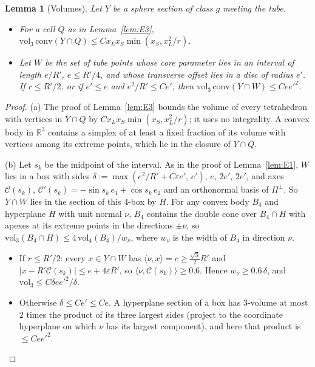 \documentclass[aps,prx,twocolumn,superscriptaddress,nofootinbib,longbibliography]{revtex4-2}
\theoremstyle{plain}
\newtheorem{lemma}{Lemma}
\theoremstyle{definition}
\theoremstyle{remark}
\newcommand{\R}{\mathbb{R}}
\begin{document}
\begin{lemma}[Volumes]\label{lem:F3}
Let $Y$ be a sphere section of class $g$ meeting the tube.
\begin{itemize}\setlength\itemsep{0pt}
\item[(a)] For a cell $Q$ as in Lemma~\ref{lem:E3}, $\mathrm{vol}_3\,\mathrm{conv}(Y\cap Q)\le Cx_Lx_S\min(x_S,x_L^2/r)$.
\item[(b)] Let $W$ be the set of tube points whose core parameter lies in an interval of length $e/R'$, $e\le R'/4$, and whose transverse offset lies in a disc of radius $e'$. If $r\le R'/2$, or if $e'\le e$ and $e^2/R'\le Ce'$, then $\mathrm{vol}_3\,\mathrm{conv}(Y\cap W)\le Cee'^2$.
\end{itemize}
\end{lemma}
\begin{proof}
(a) The proof of Lemma~\ref{lem:E3} bounds the volume of every tetrahedron with vertices in $Y\cap Q$ by $Cx_Lx_S\min(x_S,x_L^2/r)$; it uses no integrality. A convex body in $\R^3$ contains a simplex of at least a fixed fraction of its volume with vertices among its extreme points, which lie in the closure of $Y\cap Q$.

(b) Let $s_k$ be the midpoint of the interval. As in the proof of Lemma~\ref{lem:E1}, $W$ lies in a box with sides $\delta:=\max(e^2/R'+C\varepsilon e',\,e')$, $e$, $2e'$, $2e'$, and axes $\mathcal C(s_k)$, $\mathcal C'(s_k)=-\sin s_k\,e_1+\cos s_k\,e_2$ and an orthonormal basis of $\Pi^\perp$. So $Y\cap W$ lies in the section of this $4$-box by $H$. For any convex body $B_4$ and hyperplane $H$ with unit normal $\nu$, $B_4$ contains the double cone over $B_4\cap H$ with apexes at its extreme points in the directions $\pm\nu$, so $\mathrm{vol}_3(B_4\cap H)\le4\,\mathrm{vol}_4(B_4)/w_\nu$, where $w_\nu$ is the width of $B_4$ in direction $\nu$.
\begin{itemize}\setlength\itemsep{0pt}
\item If $r\le R'/2$: every $x\in Y\cap W$ has $\langle\nu,x\rangle=c\ge\tfrac{\sqrt3}2R'$ and $|x-R'\mathcal C(s_k)|\le e+4\varepsilon R'$, so $\langle\nu,\mathcal C(s_k)\rangle\ge0.6$. Hence $w_\nu\ge0.6\,\delta$, and $\mathrm{vol}_3\le C\delta ee'^2/\delta$.
\item Otherwise $\delta\le Ce'\le Ce$. A hyperplane section of a box has $3$-volume at most $2$ times the product of its three largest sides (project to the coordinate hyperplane on which $\nu$ has its largest component), and here that product is $\le Cee'^2$.
\end{itemize}
\end{proof}
\end{document}
